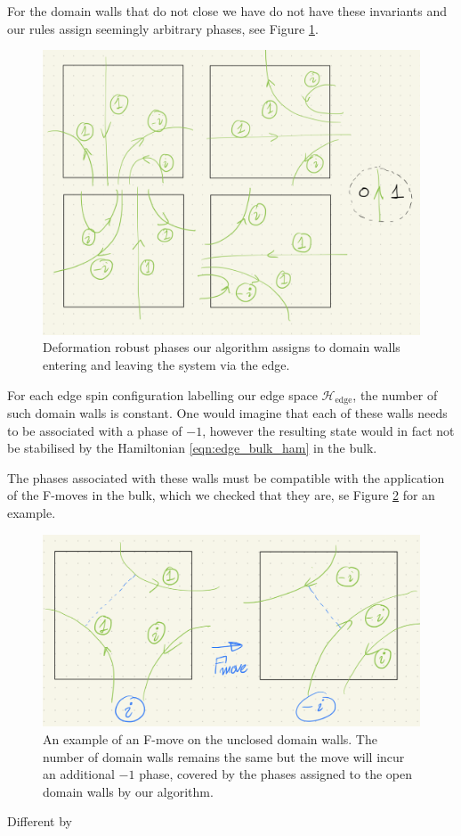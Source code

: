 \documentclass[a4paper,twocolumn,11pt]{quantumarticle}
\begin{document}
For the domain walls that do not close we have do not have these invariants and our rules assign seemingly arbitrary phases, see Figure \ref{fig:edge_wall_phases}.
\begin{figure}
\centering
\includegraphics[width=\linewidth]{Figures/edge_wall_phases.png}
\caption{Deformation robust phases our algorithm assigns to domain walls entering and leaving the system via the edge.}
\label{fig:edge_wall_phases}
\end{figure}
For each edge spin configuration labelling our edge space $\mathcal{H}_{\text{edge}}$, the number of such domain walls is constant.
One would imagine that each of these walls needs to be associated with a phase of $-1$, however the resulting state would in fact not be stabilised by the Hamiltonian \eqref{eqn:edge_bulk_ham} in the bulk.

The phases associated with these walls must be compatible with the application of the F-moves in the bulk, which we checked that they are, se Figure \ref{fig:bulk_edge_move} for an example.\begin{figure}
\centering
\includegraphics[width=\linewidth]{Figures/bulk_F_move.png}
\caption{An example of an F-move on the unclosed domain walls. The number of domain walls remains the same but the move will incur an additional $-1$ phase, covered by the phases assigned to the open domain walls by our algorithm.}
\label{fig:bulk_edge_move}
\end{figure}
Different by 




\end{document}
